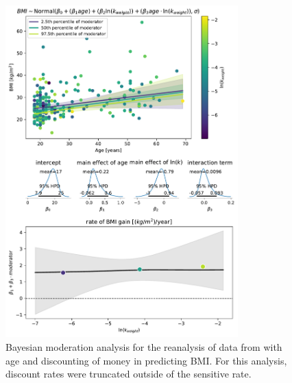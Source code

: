 \documentclass[12pt, a4paper]{article}
\begin{document}
\begin{figure}
	\centering
	\includegraphics[width=0.8\textwidth]{veillard_vincent_2020_reanalysis/veillard_vincent_reanalysis_truncated_weight.pdf} 
	\caption{Bayesian moderation analysis for the reanalysis of data from \cite{VeillardVincent2020} with age and discounting of money in predicting BMI. For this analysis, discount rates were truncated outside of the sensitive rate.}
	\label{fig:vv_money_trunc}
\end{figure}


\end{document}
